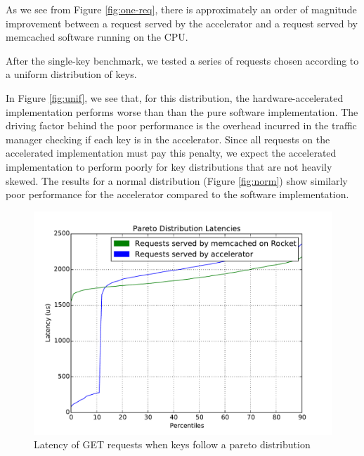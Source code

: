 As we see from Figure \ref{fig:one-req}, there is approximately an order of
magnitude improvement between a request served by the accelerator and a
request served by memcached software running on the CPU.

After the single-key benchmark, we tested a series of requests chosen
according to a uniform distribution of keys.

In Figure \ref{fig:unif}, we see that, for this distribution, the
hardware-accelerated implementation performs worse than than the pure software
implementation. The driving factor behind the poor performance is the overhead
incurred in the traffic manager checking if each key is in the accelerator.
Since all requests on the accelerated implementation must pay this penalty,
we expect the accelerated implementation to perform poorly for key
distributions that are not heavily skewed. The results for a normal distribution
(Figure \ref{fig:norm}) show similarly poor performance for the accelerator
compared to the software implementation.

\begin{figure}[t]
\begin{center}
\includegraphics[width=\linewidth]{pareto.pdf}
\caption{Latency of GET requests when keys follow a pareto distribution}
\label{fig:pareto}
\end{center}
\end{figure}

